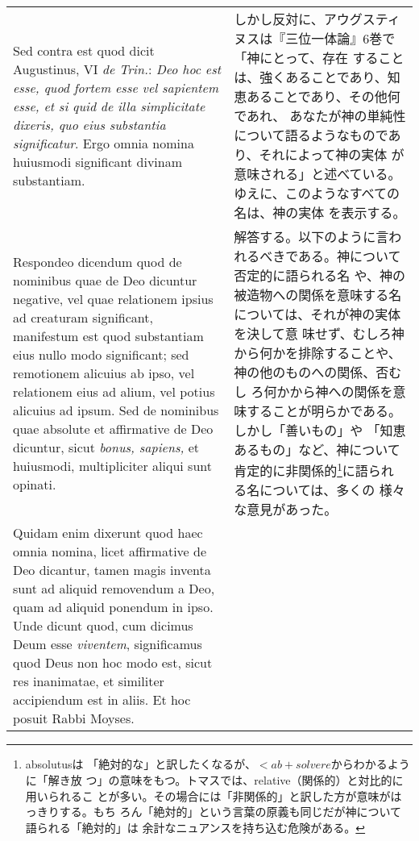 \documentclass[10pt]{jsarticle} %
\begin{document}
\begin{longtable}{p{21em}p{21em}}
\\

{\sc Sed contra est} quod dicit Augustinus, VI {\it de Trin.}: {\it
 Deo hoc est esse, quod fortem esse vel sapientem esse, et si quid de
 illa simplicitate dixeris, quo eius substantia significatur}. Ergo
 omnia nomina huiusmodi significant divinam substantiam.


&

しかし反対に、アウグスティヌスは『三位一体論』6巻で「神にとって、存在
 することは、強くあることであり、知恵あることであり、その他何であれ、
 あなたが神の単純性について語るようなものであり、それによって神の実体
 が意味される」と述べている。ゆえに、このようなすべての名は、神の実体
 を表示する。

\\

{\sc Respondeo dicendum} quod de nominibus quae de Deo dicuntur
negative, vel quae relationem ipsius ad creaturam significant,
manifestum est quod substantiam eius nullo modo significant; sed
remotionem alicuius ab ipso, vel relationem eius ad alium, vel potius
alicuius ad ipsum. Sed de nominibus quae absolute et affirmative de Deo
dicuntur, sicut {\it bonus, sapiens,} et huiusmodi, multipliciter aliqui sunt
opinati. 

&

解答する。以下のように言われるべきである。神について否定的に語られる名
や、神の被造物への関係を意味する名については、それが神の実体を決して意
味せず、むしろ神から何かを排除することや、神の他のものへの関係、否むし
ろ何かから神への関係を意味することが明らかである。しかし「善いもの」や
「知恵あるもの」など、神について肯定的に非関係的\footnote{absolutusは
「絶対的な」と訳したくなるが、$< ab + solvere$からわかるように「解き放
つ」の意味をもつ。トマスでは、relative（関係的）と対比的に用いられるこ
とが多い。その場合には「非関係的」と訳した方が意味がはっきりする。もち
ろん「絶対的」という言葉の原義も同じだが神について語られる「絶対的」は
余計なニュアンスを持ち込む危険がある。}に語られる名については、多くの
様々な意見があった。


\\

Quidam enim dixerunt quod haec omnia nomina, licet affirmative
de Deo dicantur, tamen magis inventa sunt ad aliquid removendum a Deo,
quam ad aliquid ponendum in ipso. Unde dicunt quod, cum dicimus Deum
esse {\it viventem}, significamus quod Deus non hoc modo est, sicut res
inanimatae, et similiter accipiendum est in aliis. Et hoc posuit Rabbi
Moyses. 



\end{longtable}
\end{document}
